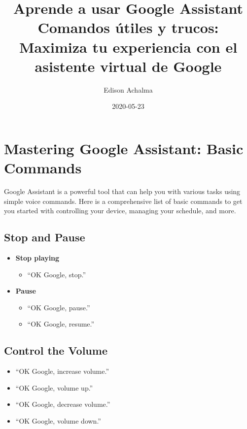 \documentclass[
  jou,
  floatsintext,
  longtable,
  a4paper,
  nolmodern,
  notxfonts,
  notimes,
  colorlinks=true,linkcolor=blue,citecolor=blue,urlcolor=blue]{apa7}
\title{Aprende a usar Google Assistant Comandos útiles y trucos:
Maximiza tu experiencia con el asistente virtual de Google}
\author{Edison Achalma}
\affiliation{
{Economía, Universidad Nacional de San Cristóbal de Huamanga}}
\date{2020-05-23}
\providecommand{\tightlist}{%
  \setlength{\itemsep}{0pt}\setlength{\parskip}{0pt}}
\begin{document}
\maketitle


\setcounter{secnumdepth}{-\maxdimen} %

\setlength\LTleft{0pt}


\section{Mastering Google Assistant: Basic
Commands}\label{mastering-google-assistant-basic-commands}

Google Assistant is a powerful tool that can help you with various tasks
using simple voice commands. Here is a comprehensive list of basic
commands to get you started with controlling your device, managing your
schedule, and more.

\subsection{Stop and Pause}\label{stop-and-pause}

\begin{itemize}
\tightlist
\item
  \textbf{Stop playing}

  \begin{itemize}
  \tightlist
  \item
    ``OK Google, stop.''
  \end{itemize}
\item
  \textbf{Pause}

  \begin{itemize}
  \tightlist
  \item
    ``OK Google, pause.''
  \item
    ``OK Google, resume.''
  \end{itemize}
\end{itemize}

\subsection{Control the Volume}\label{control-the-volume}

\begin{itemize}
\tightlist
\item
  ``OK Google, increase volume.''
\item
  ``OK Google, volume up.''
\item
  ``OK Google, decrease volume.''
\item
  ``OK Google, volume down.''
\end{itemize}
\end{document}
